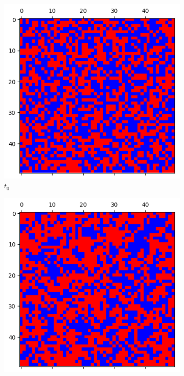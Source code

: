 \documentclass[letterpaper]{article}
\begin{document}
\begin{figure}
    \begin{subfigure}{.3\textwidth}
      \centering
      \includegraphics[width=1\linewidth]{images/assign2/visu_50-part2/t0}
      \caption{$t_0$}
      \label{fig:t0_50part2}
    \end{subfigure}
    \begin{subfigure}{.3\textwidth}
      \centering
      \includegraphics[width=1\linewidth]{images/assign2/visu_50-part2/t5}

\end{subfigure}
\end{figure}
\end{document}
